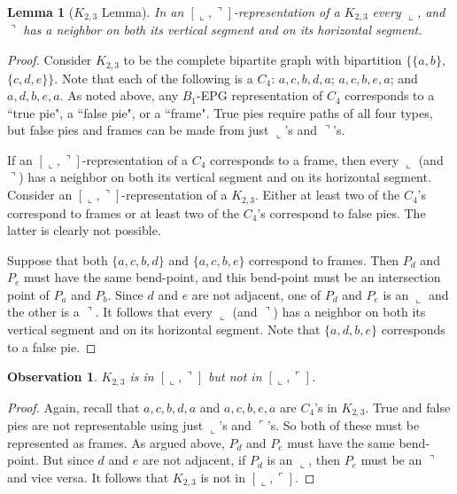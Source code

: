 \documentclass[11pt,3p,times]{elsarticle}
\newenvironment{myproof}{\begin{proof}}{\end{proof}}
\newcommand{\La}{\ensuremath{\llcorner}} \newcommand{\Lb}{\ensuremath{\ulcorner}} \newcommand{\Lc}{\ensuremath{\lrcorner}} \newcommand{\Ld}{\ensuremath{\urcorner}}
\newtheorem{observation}[theorem]{Observation}
\newtheorem{lemma}[theorem]{Lemma}
\begin{document}
\begin{lemma}[$K_{2,3}$ Lemma]\label{lem:K2,3}
In an $[\La,\Ld]$-representation of a $K_{2,3}$ every $\La$, and $\Ld$ has a neighbor on both its vertical segment and on its horizontal segment.
\end{lemma}
\begin{myproof}
Consider $K_{2,3}$
to be the complete bipartite graph with bipartition $\{\{a,b\},$
$\{c,d,e\}\}$. Note that each of the following is a $C_4$:
$a,c,b,d,a$; $a,c,b,e,a$; and $a,d,b,e,a$. As noted above, any
$B_1$-EPG representation of $C_4$ corresponds to  a ``true pie", a
``false pie", or a ``frame".  True pies require paths of all four
types, but false pies and frames can be made from just $\La$'s and
$\Ld$'s.









If an $[\La,\Ld]$-representation of a $C_4$ corresponds to a
frame, then every $\La$ (and $\Ld$) has a neighbor on both
its vertical segment and on its horizontal segment. Consider an
$[\La,\Ld]$-representation of a $K_{2,3}$. Either at least two of the $C_4$'s
correspond to frames or at least two of the $C_4$'s correspond to false pies.
The latter is clearly not possible.

Suppose that both  $\{a,c,b,d\}$ and $\{a,c,b,e\}$
correspond to frames.  Then $P_d$ and $P_e$ must have the same
bend-point, and this bend-point must be an  intersection point of
$P_a$ and $P_b$. Since $d$ and $e$ are not adjacent, one of $P_d$
and $P_e$ is an $\La$ and the other is a $\Ld$. It follows that
every $\La$ (and $\Ld$) has a neighbor on both its vertical
segment and on its horizontal segment. Note that $\{a,d,b,e\}$ corresponds
to a false pie.
\end{myproof}
\begin{observation}\label{obs:K2,3}
$K_{2,3}$ is in $[\La,\Ld]$ but not in $[\La,\Lb]$. 
\end{observation}
\begin{myproof}
Again, recall
that $a,c,b,d,a$ and $a,c,b,e,a$ are $C_4$'s in $K_{2,3}$. True and
false pies are not representable using just $\La$'s and $\Lb$'s.  So
both of these must be represented as frames.  As argued above,
$P_d$ and $P_e$ must have the same bend-point.  But since $d$ and
$e$ are not adjacent, if $P_d$ is an $\La$, then $P_e$ must be an
$\Ld$ and vice versa. It follows that $K_{2,3}$ is not in
$[\La,\Lb]$.
\end{myproof}
\end{document}
